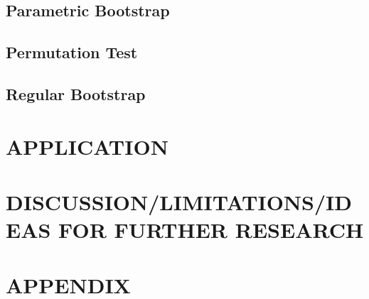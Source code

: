 \documentclass[12pt, letterpaper]{article}
\begin{document}
\subsection{Parametric Bootstrap}
\subsection{Permutation Test}
\subsection{Regular Bootstrap}


\section{APPLICATION}


\section{DISCUSSION/LIMITATIONS/IDEAS FOR FURTHER RESEARCH}


\section{APPENDIX}
\end{document}
